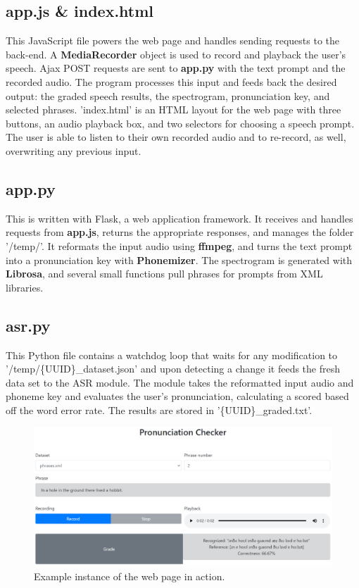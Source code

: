\documentclass[12pt, letterpaper]{article}
\begin{document}
\subsection*{app.js \& index.html}
This JavaScript file powers the web page and handles sending requests to the back-end. A \textbf{MediaRecorder} object is used to record and playback the user's speech. Ajax POST requests are sent to \textbf{app.py} with the text prompt and the recorded audio. The program processes this input and feeds back the desired output: the graded speech results, the spectrogram, pronunciation key, and selected phrases. 'index.html' is an HTML layout for the web page with three buttons, an audio playback box, and two selectors for choosing a speech prompt. The user is able to listen to their own recorded audio and to re-record, as well, overwriting any previous input.

\subsection*{app.py}
This is written with Flask, a web application framework. It receives and handles requests from \textbf{app.js}, returns the appropriate responses, and manages the folder '/temp/'. It reformats the input audio using \textbf{ffmpeg}, and turns the text prompt into a pronunciation key with \textbf{Phonemizer}. The spectrogram is generated with \textbf{Librosa}, and several small functions pull phrases for prompts from XML libraries. 

\subsection*{asr.py}
This Python file contains a watchdog loop that waits for any modification to \\'/temp/\{UUID\}\_dataset.json' and upon detecting a change it feeds the fresh data set to the ASR module. The module takes the reformatted input audio and phoneme key and evaluates the user's pronunciation, calculating a scored based off the word error rate. The results are stored in '\{UUID\}\_graded.txt'.

\begin{figure}[h!]
    \centering
    \includegraphics[scale=0.5]{images/results.pdf}
    \caption{Example instance of the web page in action.}
\end{figure}
\end{document}

